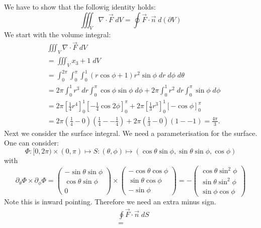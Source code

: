 \documentclass[11pt]{article}
\begin{document}
\begin{solution}    
    We have to show that the followig identity holds: 
    \[
    \iiint_{V}\nabla \cdot \vec{F}\;dV =  \oint \vec{F}\cdot \vec{n} \;d(\partial V)
    \] 
    We start with the volume integral:
    \begin{align*}
        &
        \iiint_{V}\nabla \cdot \vec{F}\;dV
        \\&
        =
        \iiint_{V}x_3 + 1\;dV
        \\&
        =
        \int_{0}^{2\pi}\int_0^{\pi}\int_0^ 1 (r\cos\phi + 1)r^ 2\sin\phi\;d r\;d\phi\;d\theta
        \\&
        =
        2\pi\int_0^1 r^3\;d r\int_0^{\pi}\cos\phi\sin\phi\;d \phi + 2\pi\int_0^1 r^2\;d r\int_0^{\pi}\sin\phi\;d \phi 
        \\&
        =
        2\pi\left[ \frac{1}{4}r^ 4 \right]_0^ {1} \left[-\frac{1}{4}\cos2\phi\right]_0^{\pi} + 2\pi\left[ \frac{1}{3}r^ 3 \right]_0^ {1} \left[-\cos\phi\right]_0^{\pi}
        \\&
        =
        2\pi\left(\frac{1}{4} - 0\right)\left(\frac{1}{4} - -\frac{1}{4}\right) + 2\pi\left(\frac{1}{3} - 0\right)\left(1 - - 1\right) = \frac{4\pi}{3}
        .
    \end{align*}
    Next we consider the surface integral. We need a parameterisation for the surface. One can consider:
    \[
    \Phi: [0,2\pi) \times (0,\pi) \mapsto S: (\theta,\phi)\mapsto (\cos\theta \sin\phi, \sin\theta\sin\phi,\cos\phi)
    \]
    with 
    \[
    \partial_{\theta}\Phi\times \partial_{\phi}\Phi  = \begin{pmatrix} -\sin\theta\sin\phi\\ \cos\theta\sin\phi \\0 \end{pmatrix} \times \begin{pmatrix} -\cos\theta\cos\phi\\ \sin\theta\cos\phi \\-\sin\phi \end{pmatrix} = -\begin{pmatrix} \cos\theta\sin^2\phi\\ \sin\theta\sin^2\phi \\\sin\phi\cos\phi \end{pmatrix} 
    \]
    Note this is inward pointing. Therefore we need an extra minus sign.
    \begin{align*}
        &
        \oint \vec{F}\cdot \vec{n} \;dS
        \\&
        =

\end{align*}
\end{solution}
\end{document}
